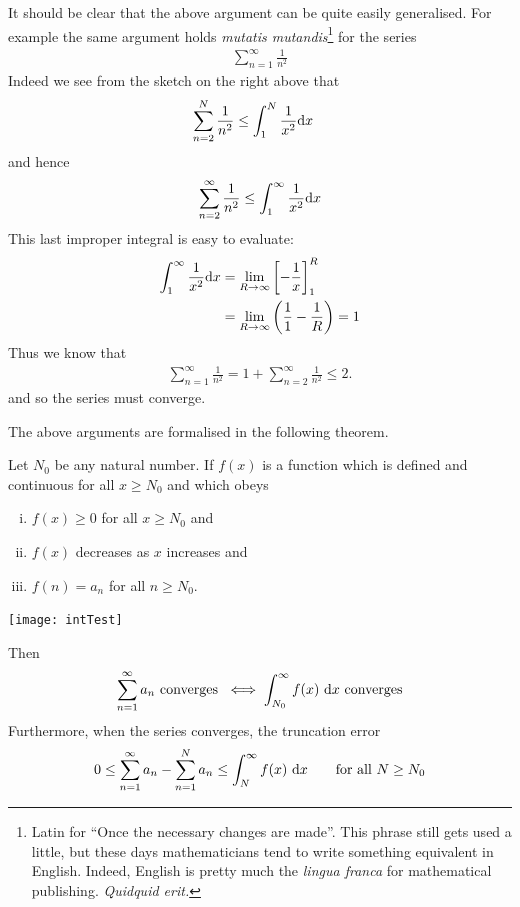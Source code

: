 \begin{eg}
It should be clear that the above argument can be quite easily
generalised. For example the same argument holds
\emph{mutatis mutandis}\footnote{Latin for ``Once the necessary changes
are made''. This phrase still gets used a little, but
these days mathematicians tend to write something equivalent in English. Indeed, English is pretty much the \emph{lingua franca} for
mathematical publishing. \emph{Quidquid erit.}} for the series
\begin{align*}
  \sum_{n=1}^\infty \frac{1}{n^2}
\end{align*}
Indeed we see from the sketch on the right above that
\begin{align*}
  \sum_{n=2}^N \frac{1}{n^2}
  &\le \int_1^N \frac{1}{x^2}\mathrm{d}x
\end{align*}
and hence
\begin{align*}
  \sum_{n=2}^\infty \frac{1}{n^2}
   \leq \int_1^\infty \frac{1}{x^2}\mathrm{d}x
\end{align*}
This last improper integral is easy to evaluate:
\begin{align*}
  \int_1^\infty \frac{1}{x^2}\mathrm{d}x
  &= \lim_{R\to\infty} \left[ - \frac{1}{x} \right]_1^R \\
  &= \lim_{R\to\infty} \left( \frac{1}{1} - \frac{1}{R} \right)
  = 1
\end{align*}
Thus we know that
\begin{align*}
  \sum_{n=1}^\infty \frac{1}{n^2}
 = 1+ \sum_{n=2}^\infty \frac{1}{n^2} \leq 2.
\end{align*}
and so the series must converge.
\end{eg}


The above arguments are formalised in the following theorem.
\begin{theorem}\label{thm:SRintegralTest}
Let $N_0$ be any natural number. If $f(x)$ is a function which is defined
and continuous for all $x\ge N_0$ and which obeys
\begin{enumerate}[(i)]\itemsep1pt \parskip0pt  %
\item $f(x)\ge 0$ for all $x\ge N_0$ and
\item $f(x)$ decreases as $x$ increases and
\item $f(n)=a_n$ for all  $n\ge N_0$.
\end{enumerate}
\begin{center}
   \texttt{[image: intTest]}
\end{center}
Then
\begin{equation*}
\sum_{n=1}^\infty a_n\text{ converges }\iff
\int_{N_0}^\infty f(x)\ \mathrm{d}x\text{ converges}
\end{equation*}
Furthermore, when the series converges, the truncation error
\begin{equation*}
0\le \sum_{n=1}^\infty a_n-\sum_{n=1}^N a_n\le
  \int_N^\infty f(x)\ \mathrm{d}x\qquad\text{for all $N\ge N_0$}
\end{equation*}
\end{theorem}

